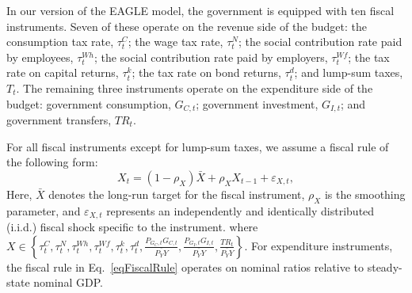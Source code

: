 \documentclass[a4paper,11pt]{article}
\numberwithin{equation}{section}
\begin{document}


In our version of the EAGLE model, the government is equipped with ten fiscal instruments. 
Seven of these operate on the revenue side of the budget: the consumption tax rate, $\tau_t^C$; the wage tax rate, $\tau_t^N$; the social contribution rate paid by employees, $\tau_t^{Wh}$; the social contribution rate paid by employers, $\tau_t^{Wf}$; the tax rate on capital returns, $\tau_t^k$; the tax rate on bond returns, $\tau_t^d$; and lump-sum taxes, $T_t$.
The remaining three instruments operate on the expenditure side of the budget: government consumption, $G_{C,t}$; government investment, $G_{I,t}$; and government transfers, $TR_t$.

For all fiscal instruments except for lump-sum taxes, we assume a fiscal rule of the following form:
\begin{equation}
    \label{eqFiscalRule}
    X_t = (1-\rho_X) \bar{X} + \rho_X X_{t-1} + \varepsilon_{X,t},
\end{equation}
Here, $\bar{X}$ denotes the long-run target for the fiscal instrument, $\rho_X$ is the smoothing parameter, and $\varepsilon_{X,t}$ represents an independently and identically distributed (i.i.d.) fiscal shock specific to the instrument.
where \(X \in \left\{ \tau_t^C, \tau_t^N, \tau_t^{Wh}, \tau_t^{Wf}, \tau_t^k, \tau_t^d, \frac{P_{G_C,t} G_{C,t}}{\overline{P_Y Y}}, \frac{P_{G_I,t} G_{I,t}}{\overline{P_Y Y}}, \frac{TR_t}{\overline{P_Y Y}} \right\}\).
For expenditure instruments, the fiscal rule in Eq.~\ref{eqFiscalRule} operates on nominal ratios relative to steady-state nominal GDP.
\end{document}
